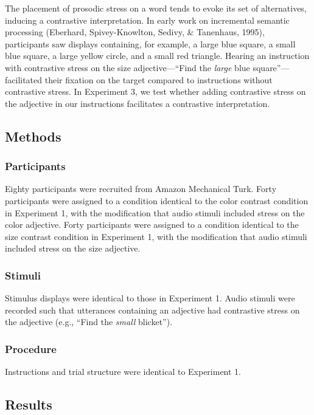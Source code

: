 \documentclass[10pt, letterpaper]{article}
\begin{document}
The placement of prosodic stress on a word tends to evoke its set of
alternatives, inducing a contrastive interpretation. In early work on
incremental semantic processing (Eberhard, Spivey-Knowlton, Sedivy, \&
Tanenhaus, 1995), participants saw displays containing, for example, a
large blue square, a small blue square, a large yellow circle, and a
small red triangle. Hearing an instruction with contrastive stress on
the size adjective---``Find the \emph{large} blue square''---facilitated
their fixation on the target compared to instructions without
contrastive stress. In Experiment 3, we test whether adding contrastive
stress on the adjective in our instructions facilitates a contrastive
interpretation.

\subsection{Methods}\label{methods-1}

\subsubsection{Participants}\label{participants-1}

Eighty participants were recruited from Amazon Mechanical Turk. Forty
participants were assigned to a condition identical to the color
contrast condition in Experiment 1, with the modification that audio
stimuli included stress on the color adjective. Forty participants were
assigned to a condition identical to the size contrast condition in
Experiment 1, with the modification that audio stimuli included stress
on the size adjective.

\subsubsection{Stimuli}\label{stimuli-1}

Stimulus displays were identical to those in Experiment 1. Audio stimuli
were recorded such that utterances containing an adjective had
contrastive stress on the adjective (e.g., ``Find the \emph{small}
blicket'').

\subsubsection{Procedure}\label{procedure-1}

Instructions and trial structure were identical to Experiment 1.

\subsection{Results}\label{results-2}
\end{document}
